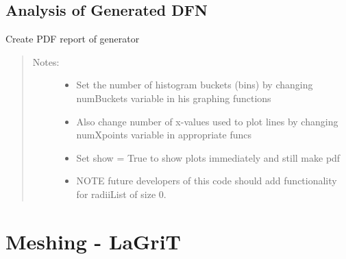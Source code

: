 \documentclass[letterpaper,10pt,english]{sphinxmanual}
\begin{document}
\subsection{Analysis of Generated DFN}
\label{\detokenize{pydfnworks:module-pydfnworks.dfnGen.gen_output}}\label{\detokenize{pydfnworks:analysis-of-generated-dfn}}

\begin{fulllineitems}
\label{\detokenize{pydfnworks:pydfnworks.dfnGen.gen_output.output_report}}
Create PDF report of generator
\begin{quote}
\begin{description}
\item[{Notes:}] \leavevmode\begin{itemize}
\item {} 
Set the number of histogram buckets (bins) by changing numBuckets variable in his graphing functions

\item {} 
Also change number of x-values used to plot lines by changing numXpoints variable in appropriate funcs

\item {} 
Set show = True to show plots immediately and still make pdf

\item {} 
NOTE future developers of this code should add functionality for radiiList of size 0.

\end{itemize}

\end{description}
\end{quote}

\end{fulllineitems}



\section{Meshing - LaGriT}
\label{\detokenize{pydfnworks:meshing-lagrit}}
\end{document}
